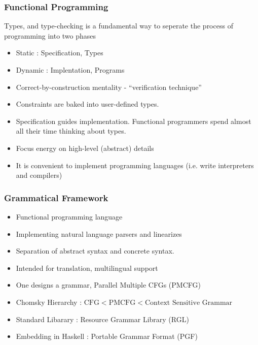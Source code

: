 \documentclass{beamer}
\begin{document}
\begin{frame}
\frametitle{Functional Programming}
\begin{block}{}
Types, and type-checking is a fundamental way to seperate the process of
programming into two phases
\begin{itemize}
\item Static  : Specification, Types 
\item Dynamic : Implentation, Programs 
\end{itemize}
\end{block}

\begin{itemize}
\item Correct-by-construction mentality - ``verification technique''
\item Constraints are baked into user-defined types.
\item Specification guides implementation. Functional
  programmers spend almost all their time thinking about types.
\item Focus energy on high-level (abstract) details
\item It is convenient to implement programming languages
(i.e. write interpreters and compilers)
\end{itemize}
\end{frame}

\begin{frame}

\frametitle{Grammatical Framework}

\begin{itemize}
\item Functional programming language
\item Implementing natural language parsers and linearizes
\item Separation of abstract syntax and concrete syntax.
\item Intended for translation, multilingual support
\item One designs a grammar, Parallel Multiple CFGs (PMCFG)
\item Chomsky Hierarchy : $\text{CFG} < \text{PMCFG} < \text{Context Sensitive Grammar}$
\item Standard Libarary : Resource Grammar Library (RGL)
\item Embedding in Haskell : Portable Grammar Format (PGF)
\end{itemize}

\end{frame}
\end{document}
